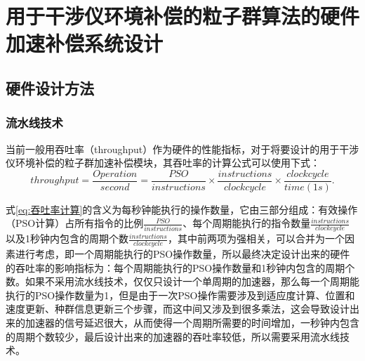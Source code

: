 \chapter{用于干涉仪环境补偿的粒子群算法的硬件加速补偿系统设计}
\section{硬件设计方法}
\subsection{流水线技术}
\label{流水线技术}
当前一般用吞吐率（throughput）作为硬件的性能指标，对于将要设计的用于干涉仪环境补偿的粒子群加速补偿模块，其吞吐率的计算公式可以使用下式：
\begin{equation}\label{eq:吞吐率计算}
    throughput = \frac{Operation}{second}=\frac{PSO}{instructions}\times \frac{instructions}{clock cycle} \times \frac{clock cycle}{time(1s)}.
    \end{equation}

式\eqref{eq:吞吐率计算}的含义为每秒钟能执行的操作数量，它由三部分组成：有效操作（PSO计算）占所有指令的比例$\frac{PSO}{instructions}$、每个周期能执行的指令数量$\frac{instructions}{clock cycle}$以及1秒钟内包含的周期个数$\frac{instructions}{clock cycle}$，其中前两项为强相关，可以合并为一个因素进行考虑，即一个周期能执行的PSO操作数量，所以最终决定设计出来的硬件的吞吐率的影响指标为：每个周期能执行的PSO操作数量和1秒钟内包含的周期个数。如果不采用流水线技术，仅仅只设计一个单周期的加速器，那么每一个周期能执行的PSO操作数量为1，但是由于一次PSO操作需要涉及到适应度计算、位置和速度更新、种群信息更新三个步骤，而这中间又涉及到很多乘法，这会导致设计出来的加速器的信号延迟很大，从而使得一个周期所需要的时间增加，一秒钟内包含的周期个数较少，最后设计出来的加速器的吞吐率较低，所以需要采用流水线技术\cite{李景琳2021基于,吴艳霞2019深度学习}。

